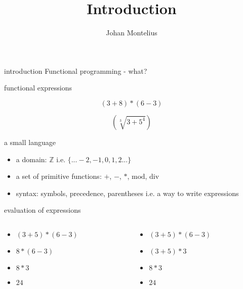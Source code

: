 


\title[ID1019 Introduction]{Introduction}

\author{Johan Montelius}
\date{\semester}



\begin{frame}
\titlepage
\end{frame}

\begin{frame}{introduction}
  Functional programming - what?
\end{frame}


\begin{frame}{functional expressions}

$$(3 + 8) * (6 - 3)$$

\pause\vspace{20pt}

$$(\sqrt[3]{3 + 5^4})$$

\end{frame}

\begin{frame}{a small language}

\pause

\begin{itemize}
 \item a domain: $\mathbb{Z}$ i.e. $\{... -2,-1,0,1,2... \}$
\pause
 \item a set of primitive functions: $+$, $-$, $*$, $\mathrm{mod}$,  $\mathrm{div}$ 
\pause
 \item syntax: symbols, precedence, parentheses i.e. a way to write expressions
\end{itemize}

\end{frame}


\begin{frame}{evaluation of expressions}
\begin{columns}
 \begin{column}{0.5\linewidth}
  \begin{itemize}
   \pause \item $(3 + 5) * (6 - 3)$
   \pause \item $8 * (6 - 3)$
   \pause \item $8 * 3$
   \pause \item $24$
  \end{itemize}   
 \end{column}
 \begin{column}{0.5\linewidth}
  \begin{itemize}
   \pause \item $(3 + 5) * (6 - 3)$
   \pause \item $(3 + 5) * 3$
   \pause \item $8 * 3$
   \pause \item $24$
  \end{itemize}   
 \end{column}
 \end{columns}
\end{frame}

